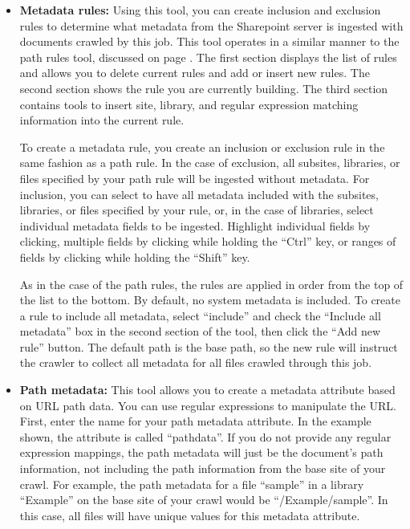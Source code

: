 \begin{itemize}

\item \textbf{Metadata rules:} Using this tool, you can create inclusion and exclusion rules to determine what metadata from the Sharepoint server is ingested with documents crawled by this job. This tool operates in a similar manner to the path rules tool, discussed on page \pageref{pathrules}. The first section displays the list of rules and allows you to delete current rules and add or insert new rules. The second section shows the rule you are currently building. The third section contains tools to insert site, library, and regular expression matching information into the current rule.

To create a metadata rule, you create an inclusion or exclusion rule
in the same fashion as a path rule. In the case of exclusion, all
subsites, libraries, or files specified by your path rule will be
ingested without metadata. For inclusion, you can select to have all
metadata included with the subsites, libraries, or files specified by
your rule, or, in the case of libraries, select individual metadata
fields to be ingested. Highlight individual fields by clicking,
multiple fields by clicking while holding the ``Ctrl'' key, or ranges
of fields by clicking while holding the ``Shift'' key.

As in the case of the path rules, the rules are applied in order from
the top of the list to the bottom. By default, no system metadata is
included. To create a rule to include all metadata, select ``include''
and check the ``Include all metadata'' box in the second section of
the tool, then click the ``Add new rule'' button. The default path is
the base path, so the new rule will instruct the crawler to collect
all metadata for all files crawled through this job.

\item \textbf{Path metadata:} This tool allows you to create a metadata attribute based on URL path data. You can use regular expressions to manipulate the URL. First, enter the name for your path metadata attribute. In the example shown, the attribute is called ``pathdata''. If you do not provide any regular expression mappings, the path metadata will just be the document's path information, not including the path information from the base site of your crawl. For example, the path metadata for a file ``sample'' in a library ``Example'' on the base site of your crawl would be ``/Example/sample''. In this case, all files will have unique values for this metadata attribute.


\end{itemize}

